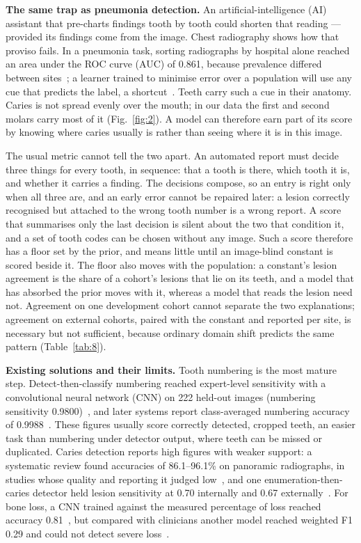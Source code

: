 \documentclass[conference]{IEEEtran}
\begin{document}
\textbf{The same trap as pneumonia detection.} An artificial-intelligence (AI) assistant that pre-charts findings tooth by tooth could shorten that reading — provided its findings come from the image. Chest radiography shows how that proviso fails. In a pneumonia task, sorting radiographs by hospital alone reached an area under the ROC curve (AUC) of 0.861, because prevalence differed between sites~\cite{zech2018variable}; a learner trained to minimise error over a population will use any cue that predicts the label, a shortcut~\cite{geirhos2020shortcut}. Teeth carry such a cue in their anatomy. Caries is not spread evenly over the mouth; in our data the first and second molars carry most of it (Fig.~\ref{fig:2}). A model can therefore earn part of its score by knowing where caries usually is rather than seeing where it is in this image.

The usual metric cannot tell the two apart. An automated report must decide three things for every tooth, in sequence: that a tooth is there, which tooth it is, and whether it carries a finding. The decisions compose, so an entry is right only when all three are, and an early error cannot be repaired later: a lesion correctly recognised but attached to the wrong tooth number is a wrong report. A score that summarises only the last decision is silent about the two that condition it, and a set of tooth codes can be chosen without any image. Such a score therefore has a floor set by the prior, and means little until an image-blind constant is scored beside it. The floor also moves with the population: a constant's lesion agreement is the share of a cohort's lesions that lie on its teeth, and a model that has absorbed the prior moves with it, whereas a model that reads the lesion need not. Agreement on one development cohort cannot separate the two explanations; agreement on external cohorts, paired with the constant and reported per site, is necessary but not sufficient, because ordinary domain shift predicts the same pattern (Table~\ref{tab:8}).

\textbf{Existing solutions and their limits.} Tooth numbering is the most mature step. Detect-then-classify numbering reached expert-level sensitivity with a convolutional neural network (CNN) on 222 held-out images (numbering sensitivity 0.9800)~\cite{tuzoff2019tooth}, and later systems report class-averaged numbering accuracy of 0.9988~\cite{zancan2025ai}. These figures usually score correctly detected, cropped teeth, an easier task than numbering under detector output, where teeth can be missed or duplicated. Caries detection reports high figures with weaker support: a systematic review found accuracies of 86.1–96.1\% on panoramic radiographs, in studies whose quality and reporting it judged low~\cite{mohammadrahimi2022deep}, and one enumeration-then-caries detector held lesion sensitivity at 0.70 internally and 0.67 externally~\cite{bizjak2024advancing}. For bone loss, a CNN trained against the measured percentage of loss reached accuracy 0.81~\cite{krois2019deep}, but compared with clinicians another model reached weighted F1 0.29 and could not detect severe loss~\cite{cerda2024determining}.
\end{document}
